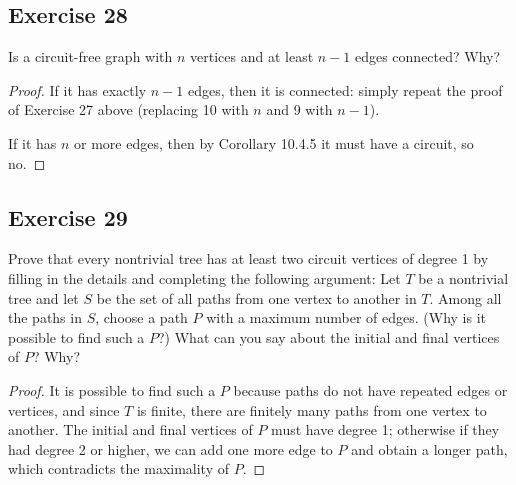 \documentclass[14pt]{extarticle}
\begin{document}
\subsection{Exercise 28}
Is a circuit-free graph with \(n\) vertices and at least \(n - 1\) edges connected? Why?

\begin{proof}
If it has exactly \(n-1\) edges, then it is connected: simply repeat the proof of Exercise 27 above (replacing 10 with \(n\)
and 9 with \(n-1\)).

If it has \(n\) or more edges, then by Corollary 10.4.5 it must have a circuit, so no.
\end{proof}

\subsection{Exercise 29}
Prove that every nontrivial tree has at least two circuit vertices of degree 1 by filling in the details and completing 
the following argument: Let \(T\) be a nontrivial tree and let \(S\) be the set of all paths from one vertex to another in 
\(T\). Among all the paths in \(S\), choose a path \(P\) with a maximum number of edges. (Why is it possible to find such a 
\(P\)?) What can you say about the initial and final vertices of \(P\)? Why?

\begin{proof}
It is possible to find such a \(P\) because paths do not have repeated edges or vertices, and since \(T\) is finite, there 
are finitely many paths from one vertex to another. The initial and final vertices of \(P\) must have degree 1; 
otherwise if they had degree 2 or higher, we can add one more edge to \(P\) and obtain a longer path, which contradicts the 
maximality of \(P\).
\end{proof}
\end{document}
